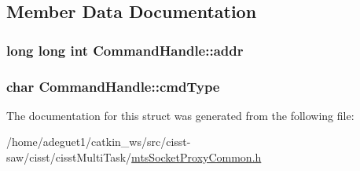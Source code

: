 \subsection{Member Data Documentation}
\hypertarget{struct_command_handle_ae2114818d86a40414c7ab7045cc7dbf5}{
\subsubsection[{addr}]{\setlength{\rightskip}{0pt plus 5cm}long long int Command\-Handle\-::addr}}\label{struct_command_handle_ae2114818d86a40414c7ab7045cc7dbf5}
\hypertarget{struct_command_handle_af84aa02e5b71b4ad1b1ede730d2a7a01}{
\subsubsection[{cmd\-Type}]{\setlength{\rightskip}{0pt plus 5cm}char Command\-Handle\-::cmd\-Type}}\label{struct_command_handle_af84aa02e5b71b4ad1b1ede730d2a7a01}


The documentation for this struct was generated from the following file\-:\begin{DoxyCompactItemize}
\item 
/home/adeguet1/catkin\-\_\-ws/src/cisst-\/saw/cisst/cisst\-Multi\-Task/\hyperlink{mts_socket_proxy_common_8h}{mts\-Socket\-Proxy\-Common.\-h}\end{DoxyCompactItemize}
